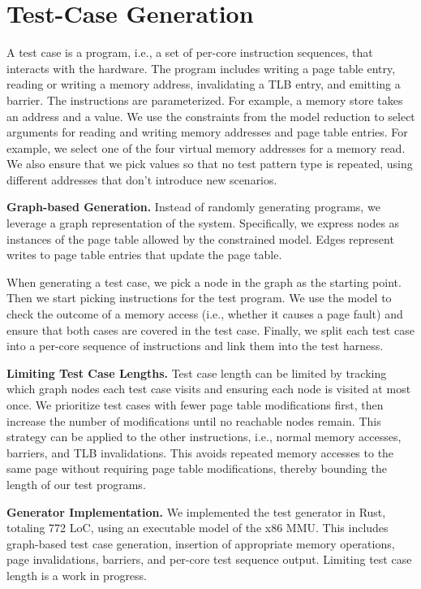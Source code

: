 \section{Test-Case Generation}\label{sec:testgen}

A test case is a program, i.e., a set of per-core instruction sequences, that interacts with the hardware. 
The program includes writing a page table entry, reading or writing a memory address, invalidating a TLB entry, and emitting a barrier.
%
The instructions are parameterized. For example, a memory store takes an address and a value. 
We use the constraints from the model reduction to select arguments for reading and writing memory addresses and page table entries. For example, we select one of the four virtual memory addresses for a memory read. We also ensure that we pick values so that no test pattern type is repeated, using different addresses that don't introduce new scenarios.

\noindent\textbf{Graph-based Generation.}
Instead of randomly generating programs, we leverage a graph representation of the system. Specifically, we express nodes as instances of the page table allowed by the constrained model. Edges represent writes to page table entries that update the page table. 

When generating a test case, we pick a node in the graph as the starting point. Then we start picking instructions for the test program. 
We use the model to check the outcome of a memory access (i.e., whether it causes a page fault) and ensure that both cases are covered in the test case.
Finally, we split each test case into a per-core sequence of instructions and link them into the test harness.

\noindent\textbf{Limiting Test Case Lengths.}
Test case length can be limited by tracking which graph nodes each test case visits and ensuring each node is visited at most once. 
We prioritize test cases with fewer page table modifications first, then increase the number of modifications until no reachable nodes remain.
This strategy can be applied to the other instructions, i.e., normal memory accesses, barriers, and TLB invalidations. This avoids repeated memory accesses to the same page without requiring page table modifications, thereby bounding the length of our test programs.

\noindent\textbf{Generator Implementation.}
We implemented the test generator in Rust, totaling 772 LoC, using an executable model of the x86 MMU. This includes graph-based test case generation, insertion of appropriate memory operations, page invalidations, barriers, and per-core test sequence output. Limiting test case length is a work in progress.
